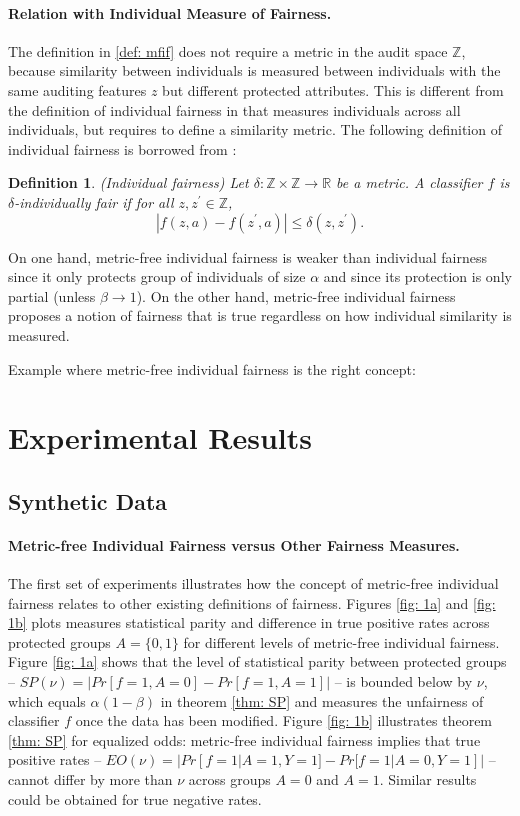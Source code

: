 \documentclass{article}
\newtheorem{defn}{Definition}[section]
\begin{document}
\paragraph{Relation with Individual Measure of Fairness.}
The definition in \ref{def: mfif} does not require a metric in the audit space $\mathbb{Z}$, because similarity between individuals is measured between individuals with the same auditing features $z$ but different protected attributes. This is different from the definition of individual fairness in \cite{dwork2012fairness} that measures individuals across all individuals, but requires to define a similarity metric. The following definition of individual fairness is borrowed from \cite{dwork2012fairness}:

\begin{defn}(Individual fairness)
Let $\delta:\mathbb{Z} \times \mathbb{Z} \rightarrow \mathbb{R}$ be a metric. A classifier $f$ is $\delta$-individually fair if for all $z, z^{'} \in \mathbb{Z}$, 
$$|f(z, a) - f(z^{'}, a)| \leq \delta(z, z^{'}).$$
\end{defn}

On one hand, metric-free individual fairness is weaker than individual fairness since it only protects group of individuals of size $\alpha$ and since its protection is only partial (unless $\beta \rightarrow 1$). On the other hand, metric-free individual fairness proposes a notion of fairness that is true regardless on how individual similarity is measured. 

\bigskip
Example where metric-free individual fairness is the right concept: 




\section{Experimental Results}
\subsection{Synthetic Data}
\paragraph{Metric-free Individual Fairness versus Other Fairness Measures.}
The first set of experiments illustrates how the concept of metric-free individual fairness relates to other existing definitions of fairness. Figures \ref{fig: 1a} and \ref{fig: 1b} plots measures statistical parity and  difference in true positive rates across protected groups $A=\{0, 1\}$ for different levels of metric-free individual fairness. Figure \ref{fig: 1a} shows that the level of statistical parity between protected groups -- $SP(\nu)=|Pr[f=1, A=0] - Pr[f=1, A=1]|$ -- is bounded below by $\nu$, which equals $\alpha(1-\beta)$ in theorem \ref{thm: SP} and measures the unfairness of classifier $f$ once the data has been modified. Figure \ref{fig: 1b} illustrates theorem \ref{thm: SP} for equalized odds: metric-free individual fairness implies that true positive rates -- $EO(\nu)= |Pr[f=1|A=1, Y=1] - Pr[f=1|A=0, Y=1]|$ -- cannot differ by more than $\nu$ across groups $A=0$ and $A=1$. Similar results could be obtained for true negative rates.
\end{document}
